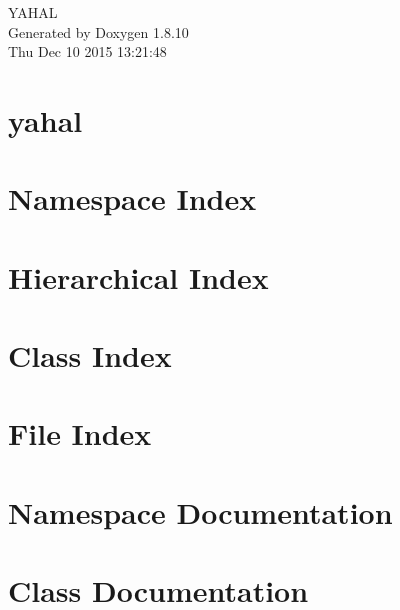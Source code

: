 \documentclass[twoside]{book}
\newcommand{\+}{\discretionary{\mbox{\scriptsize$\hookleftarrow$}}{}{}}
\newcommand{\clearemptydoublepage}{%
  \newpage{\pagestyle{empty}\cleardoublepage}%
}
\begin{document}
\hypersetup{pageanchor=false,
             bookmarks=true,
             bookmarksnumbered=true,
             pdfencoding=unicode
            }
\begin{titlepage}
\vspace*{7cm}
\begin{center}%
{\Large Y\+A\+H\+A\+L }\\
\vspace*{1cm}
{\large Generated by Doxygen 1.8.10}\\
\vspace*{0.5cm}
{\small Thu Dec 10 2015 13:21:48}\\
\end{center}
\end{titlepage}
\clearemptydoublepage
\tableofcontents
\clearemptydoublepage
{}
\hypersetup{pageanchor=true}

\chapter{yahal}
\label{md__home_andy__documentos__source_yahal__r_e_a_d_m_e}
\hypertarget{md__home_andy__documentos__source_yahal__r_e_a_d_m_e}{}

\chapter{Namespace Index}

\chapter{Hierarchical Index}

\chapter{Class Index}

\chapter{File Index}

\chapter{Namespace Documentation}





\chapter{Class Documentation}







\end{document}
